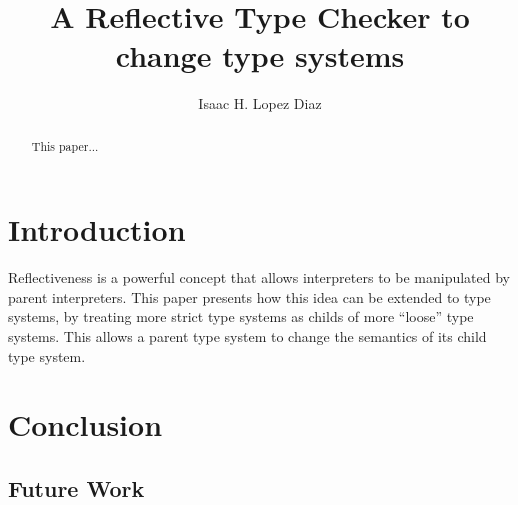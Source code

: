 \documentclass{article}
\title{A Reflective Type Checker to change type systems}
\author{Isaac H. Lopez Diaz}
\begin{document}
\maketitle

\begin{abstract}
  This paper...
\end{abstract}

\section{Introduction}
Reflectiveness is a powerful concept that allows interpreters to be manipulated by
parent interpreters. This paper presents how this idea can be extended to type systems,
by treating more strict type systems as childs of more ``loose'' type systems. This
allows a parent type system to change the semantics of its child type system.
\section{Conclusion}
\subsection{Future Work}
\end{document}
